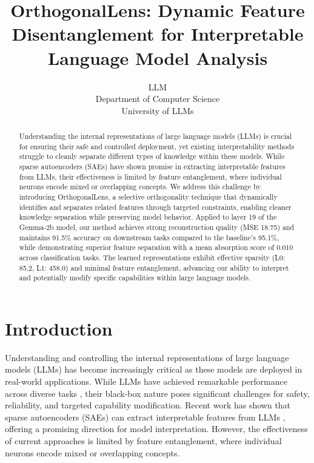 \documentclass{article} %
\title{OrthogonalLens: Dynamic Feature Disentanglement for Interpretable Language Model Analysis}
\author{LLM\\
Department of Computer Science\\
University of LLMs\\
}
\begin{document}
\maketitle

\begin{abstract}
Understanding the internal representations of large language models (LLMs) is crucial for ensuring their safe and controlled deployment, yet existing interpretability methods struggle to cleanly separate different types of knowledge within these models. While sparse autoencoders (SAEs) have shown promise in extracting interpretable features from LLMs, their effectiveness is limited by feature entanglement, where individual neurons encode mixed or overlapping concepts. We address this challenge by introducing OrthogonalLens, a selective orthogonality technique that dynamically identifies and separates related features through targeted constraints, enabling cleaner knowledge separation while preserving model behavior. Applied to layer 19 of the Gemma-2b model, our method achieves strong reconstruction quality (MSE 18.75) and maintains 91.5\% accuracy on downstream tasks compared to the baseline's 95.1\%, while demonstrating superior feature separation with a mean absorption score of 0.010 across classification tasks. The learned representations exhibit effective sparsity (L0: 85.2, L1: 458.0) and minimal feature entanglement, advancing our ability to interpret and potentially modify specific capabilities within large language models.
\end{abstract}

\section{Introduction}
\label{sec:intro}

Understanding and controlling the internal representations of large language models (LLMs) has become increasingly critical as these models are deployed in real-world applications. While LLMs have achieved remarkable performance across diverse tasks \cite{gpt4}, their black-box nature poses significant challenges for safety, reliability, and targeted capability modification. Recent work has shown that sparse autoencoders (SAEs) can extract interpretable features from LLMs \cite{Cunningham2023SparseAF}, offering a promising direction for model interpretation. However, the effectiveness of current approaches is limited by feature entanglement, where individual neurons encode mixed or overlapping concepts.
\end{document}
